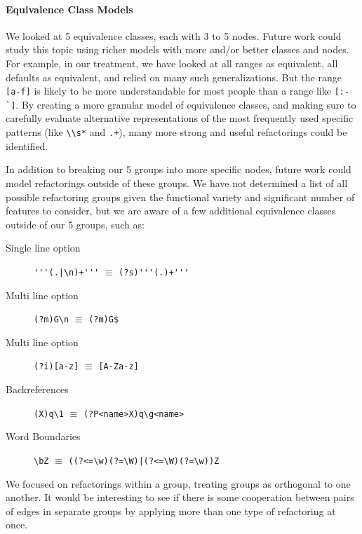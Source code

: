 \paragraph{Equivalence Class Models}
We looked at 5 equivalence classes, each with 3 to 5 nodes.  Future work could study this topic using richer models with more and/or better classes and nodes.  For example, in our treatment, we have looked at all ranges as equivalent, all defaults as equivalent, and relied on many such generalizations.  But the range \verb![a-f]! is likely to be more understandable for most people than a range like \verb![:-`]!. By creating a more granular model of equivalence classes, and making sure to carefully evaluate alternative representations of the most frequently used specific patterns (like \verb!\\s*! and \verb!.+!), many more strong and useful refactorings could be identified.

In addition to breaking our 5 groups into more specific nodes, future work could model refactorings outside of these groups.  We have not determined a list of all possible refactoring groups given the functional variety and significant number of features to consider, but we are aware of a few additional equivalence classes outside of our 5 groups, such as:
\begin{description}
\item[Single line option]  \verb!'''(.|\n)+'''! $\equiv$ \verb!(?s)'''(.)+'''!
\item[Multi line option]  \verb!(?m)G\n! $\equiv$ \verb!(?m)G$!
\item[Multi line option]  \verb!(?i)[a-z]! $\equiv$ \verb![A-Za-z]!
\item[Backreferences]  \verb!(X)q\1! $\equiv$ \verb!(?P<name>X)q\g<name>!
\item[Word Boundaries]  \verb!\bZ! $\equiv$ \verb!((?<=\w)(?=\W)|(?<=\W)(?=\w))Z!
\end{description}

We focused on refactorings within a group, treating groups as orthogonal to one another.  It would be interesting to see if there is some cooperation between pairs of edges in separate groups by applying more than one type of refactoring at once.

